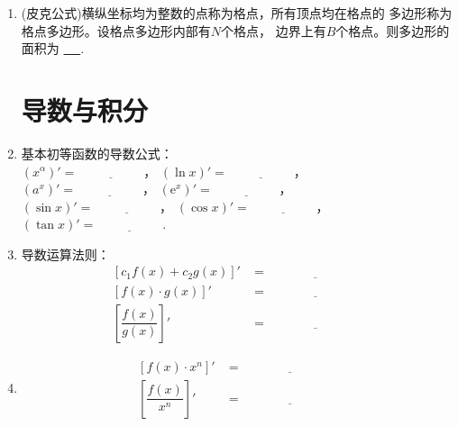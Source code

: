 \documentclass{article}
\newif\ifte
\newcommand{\e}{\mathrm{e}}
\begin{document}
\begin{multicols}{2}
\begin{enumerate}[leftmargin=20pt]
\item (皮克公式)横纵坐标均为整数的点称为格点，所有顶点均在格点的
多边形称为格点多边形。设格点多边形内部有$ N $个格点，
边界上有$ B $个格点。则多边形的面积为
\underline{\ \ifte $ N+\dfrac{B}{2}-1 $
    \else \hspace{3cm} \fi\ }.

\section{导数与积分}

\item 基本初等函数的导数公式：\\
$ (x^{\alpha})'=\underline{\ \ifte \alpha x^{\alpha-1}
    \else \hspace{2cm} \fi\ } $，
$ (\ln x)'=\underline{\ \ifte \frac{1}{x}\else \hspace{2cm} \fi\ } $，\\
$ (a^x)'=\underline{\ \ifte (\ln a) a^x\else \hspace{2cm} \fi\ } $，
$ (\e^x)'=\underline{\ \ifte \e^x\else \hspace{2cm} \fi\ } $，\\
$ (\sin x)'=\underline{\ \ifte \cos  x\else \hspace{2cm} \fi\ } $，
$ (\cos  x)'=\underline{\ \ifte -\sin x\else \hspace{2cm} \fi\ } $，\\
$ (\tan x)'=\underline{\ \ifte \dfrac{1}{\cos ^2 x}
    \else \hspace{2cm} \fi\ } $.

\item 导数运算法则：
\begin{align*}
\left[c_1f(x)+c_2g(x)\right]'&=\underline{\ \ifte 
    c_1f'(x)+c_2g'(x) \else \hspace{3cm} \fi\ } \\
\left[f(x)\cdot g(x) \right]'&= \underline{\ \ifte 
    f'(x)\cdot g(x)+f(x)\cdot g'(x) \else \hspace{3cm} \fi\ } \\
\left[ \dfrac{f(x)}{g(x)}\right]'&=\underline{\ \ifte 
    \dfrac{f'(x)\cdot g(x)-f(x)\cdot g'(x)}{g^2(x)}
    \else \hspace{3cm} \fi\ }
\end{align*}

\item 
\begin{align*}
    \left[f(x)\cdot x^n \right]'&= \underline{\ 
      \ifte x^n f'(x)+nx^{n-1}f(x) \else \hspace{3cm} \fi\ } \\
    \left[ \dfrac{f(x)}{x^n}\right]' &=\underline{\ 
      \ifte \dfrac{xf'(x)-nf(x)}{x^{n+1}} \else \hspace{3cm} \fi\ }
\end{align*}



\end{enumerate}
\end{multicols}
\end{document}
